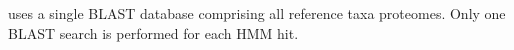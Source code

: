 \pname uses a single BLAST database comprising all reference taxa proteomes.
Only one BLAST search is performed for each HMM hit.
